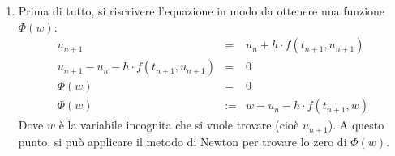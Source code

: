 \begin{enumerate}
\begin{enumerate}
        \item Prima di tutto, si riscrivere l'equazione in modo da ottenere una funzione $\Phi(w)$:
        \begin{equation*}
            \begin{array}{rcl}
                u_{n+1} &=& u_{n} + h \cdot f\left(t_{n+1}, u_{n+1}\right) \\[.3em]
                u_{n+1} - u_{n} - h \cdot f\left(t_{n+1}, u_{n+1}\right) &=& 0 \\[.3em]
                \Phi(w) &=& 0 \\[.3em]
                \Phi(w) &:=& w - u_{n} - h \cdot f\left(t_{n+1}, w\right)
            \end{array}
        \end{equation*}
        Dove $w$ è la variabile incognita che si vuole trovare (cioè $u_{n+1}$). A questo punto, si può applicare il metodo di Newton per trovare lo zero di $\Phi(w)$.


\end{enumerate}
\end{enumerate}
